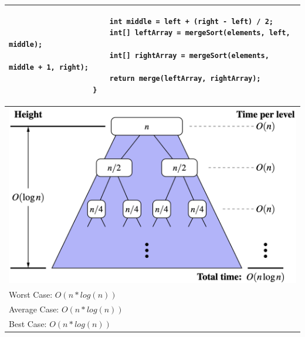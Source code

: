 \documentclass[a4paper, landscape, 8pt]{scrartcl}
\begin{document}
\begin{multicols*}{4}
\begin{tabular}{|p{6.55cm}|}
\begin{lstlisting}
                        int middle = left + (right - left) / 2;
                        int[] leftArray = mergeSort(elements, left, middle);
                        int[] rightArray = mergeSort(elements, middle + 1, right);
                        return merge(leftArray, rightArray);
                    }
                    \end{lstlisting} \\
                    \hline
                    \includegraphics[scale=0.12]{graphic/05_laufzeit_mergesort} \\
                    \hline
                    Worst Case: $O(n*log(n))$ \\
                    Average Case: $O(n*log(n))$ \\
                    Best Case: $O(n*log(n))$ \\
                    \hline
                \end{tabular}


\end{multicols*}
\end{document}
